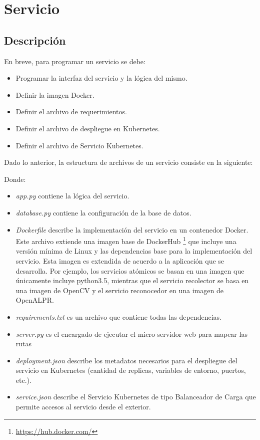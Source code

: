 \section{Servicio}
\subsection{Descripción}
En breve, para programar un servicio se debe:
\begin{itemize}
    \item Programar la interfaz del servicio y la lógica del mismo.
    \item Definir la imagen Docker.
    \item Definir el archivo de requerimientos.
    \item Definir el archivo de despliegue en Kubernetes.
    \item Definir el archivo de Servicio Kubernetes.
\end{itemize}
Dado lo anterior, la estructura de archivos de un servicio consiste en la siguiente:

\vspace{0.5cm}
\pagebreak
Donde:
\begin{itemize}
\item \textit{app.py} contiene la lógica del servicio.
\item \textit{database.py} contiene la configuración de la base de datos.
\item \textit{Dockerfile} describe la implementación del servicio en un contenedor Docker. Este archivo extiende una imagen base de DockerHub  \footnote{\url{https://hub.docker.com/}} que incluye una versión mínima de Linux y las dependencias base para la implementación del servicio. Esta imagen es extendida de acuerdo a la aplicación que se desarrolla. Por ejemplo, los servicios atómicos se basan en una imagen que únicamente incluye python3.5, mientras que el servicio recolector se basa en una imagen de OpenCV y el servicio reconocedor en una imagen de OpenALPR.
\item \textit{requirements.txt} es un archivo que contiene todas las dependencias.
\item \textit{server.py} es el encargado de ejecutar el micro servidor web para mapear las rutas 
\item \textit{deployment.json} describe los metadatos necesarios para el despliegue del servicio en Kubernetes (cantidad de replicas, variables de entorno, puertos, etc.).
\item \textit{service.json} describe el Servicio Kubernetes de tipo Balanceador de Carga que permite accesos al servicio desde el exterior.


\end{itemize}

